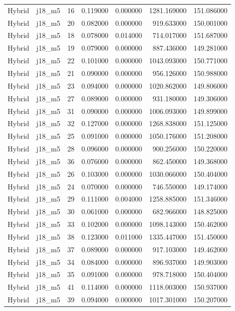 \begin{tabular}{llrrrrr}
Hybrid & j18_m5 & 16 & 0.119000 & 0.000000 & 1281.169000 & 151.086000 \\
Hybrid & j18_m5 & 20 & 0.082000 & 0.000000 & 919.633000 & 150.001000 \\
Hybrid & j18_m5 & 18 & 0.078000 & 0.014000 & 714.017000 & 151.687000 \\
Hybrid & j18_m5 & 19 & 0.079000 & 0.000000 & 887.436000 & 149.281000 \\
Hybrid & j18_m5 & 22 & 0.101000 & 0.000000 & 1043.093000 & 150.771000 \\
Hybrid & j18_m5 & 21 & 0.090000 & 0.000000 & 956.126000 & 150.988000 \\
Hybrid & j18_m5 & 23 & 0.094000 & 0.000000 & 1020.862000 & 149.806000 \\
Hybrid & j18_m5 & 27 & 0.089000 & 0.000000 & 931.180000 & 149.306000 \\
Hybrid & j18_m5 & 31 & 0.090000 & 0.000000 & 1006.093000 & 149.899000 \\
Hybrid & j18_m5 & 32 & 0.127000 & 0.000000 & 1268.838000 & 151.125000 \\
Hybrid & j18_m5 & 25 & 0.091000 & 0.000000 & 1050.176000 & 151.208000 \\
Hybrid & j18_m5 & 28 & 0.096000 & 0.000000 & 900.256000 & 150.220000 \\
Hybrid & j18_m5 & 36 & 0.076000 & 0.000000 & 862.450000 & 149.368000 \\
Hybrid & j18_m5 & 26 & 0.103000 & 0.000000 & 1030.066000 & 150.404000 \\
Hybrid & j18_m5 & 24 & 0.070000 & 0.000000 & 746.550000 & 149.174000 \\
Hybrid & j18_m5 & 29 & 0.111000 & 0.004000 & 1258.885000 & 151.346000 \\
Hybrid & j18_m5 & 30 & 0.061000 & 0.000000 & 682.966000 & 148.825000 \\
Hybrid & j18_m5 & 33 & 0.102000 & 0.000000 & 1098.143000 & 150.462000 \\
Hybrid & j18_m5 & 38 & 0.123000 & 0.011000 & 1335.447000 & 151.450000 \\
Hybrid & j18_m5 & 37 & 0.089000 & 0.000000 & 917.103000 & 149.462000 \\
Hybrid & j18_m5 & 34 & 0.084000 & 0.000000 & 896.937000 & 149.903000 \\
Hybrid & j18_m5 & 35 & 0.091000 & 0.000000 & 978.718000 & 150.404000 \\
Hybrid & j18_m5 & 41 & 0.114000 & 0.000000 & 1118.003000 & 150.937000 \\
Hybrid & j18_m5 & 39 & 0.094000 & 0.000000 & 1017.301000 & 150.207000 \\

\end{tabular}
